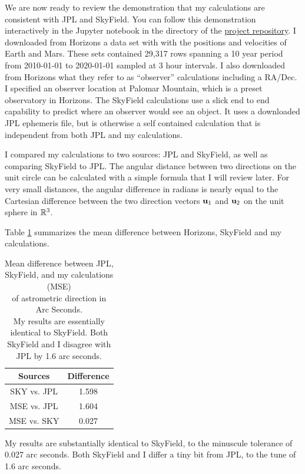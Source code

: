 We are now ready to review the demonstration that my calculations are consistent with JPL and SkyField.
You can follow this demonstration interactively in the Jupyter notebook 
 in the  directory of the \href{https://github.com/memanuel/kepler-sieve}{project repository}.
I downloaded from Horizons a data set with with the positions and velocities of Earth and Mars.
These sets contained 29,317 rows spanning a 10 year period from 2010-01-01 to 2020-01-01 sampled at 3 hour intervals.
I also downloaded from Horizons what they refer to as ``observer'' calculations including a RA/Dec.
I specified an observer location at Palomar Mountain, which is a preset observatory in Horizons.
The SkyField calculations use a slick end to end capability to predict where an observer would see an object.
It uses a downloaded JPL ephemeris file, but is otherwise a self contained calculation that is independent from both JPL and my calculations.

I compared my calculations to two sources: JPL and SkyField, as well as comparing SkyField to JPL.
The angular distance between two directions on the unit circle can be calculated with a simple formula that I will review later.  
For very small distances, the angular difference in radians is nearly equal to the Cartesian difference between the two direction
vectors $\mathbf{u}_1$ and $\mathbf{u}_2$ on the unit sphere in $\mathbb{R}^3$.

Table \ref{tbl:DirectionComparison} summarizes the mean difference between Horizons, SkyField and my calculations.
\begin{table}
\begin{centering}
\begin{tabular}{|c | c|}
\hline
Sources & Difference \\
\hline
SKY vs. JPL & 1.598 \\
MSE vs. JPL & 1.604 \\
MSE vs. SKY & 0.027 \\
\hline
\end{tabular}
\caption[Mean difference between JPL, SkyField, and my calculations of astrometric direction]
{Mean difference between JPL, SkyField, and my calculations (MSE) \\
of astrometric direction in Arc Seconds.\\
My results are essentially identical to SkyField.  Both SkyField and I disagree with JPL by 1.6 arc seconds.}
\label{tbl:DirectionComparison}
\end{centering}
\end{table}
My results are substantially identical to SkyField, to the minuscule tolerance of 0.027 arc seconds.
Both SkyField and I differ a tiny bit from JPL, to the tune of 1.6 arc seconds.

